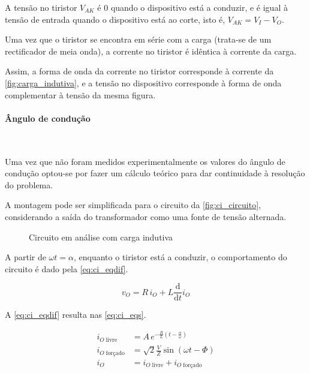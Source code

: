 \documentclass[a4paper,11pt]{article}
\numberwithin{equation}{section}
\begin{document}
A tensão no tiristor $V_{AK}$ é $0$ quando o dispositivo está a conduzir, e é igual à tensão de entrada quando o dispositivo está ao corte, isto é, $V_{AK} = V_I - V_O$.

Uma vez que o tiristor se encontra em série com a carga (trata-se de um rectificador de meia onda), a corrente no tiristor é idêntica à corrente da carga.

Assim, a forma de onda da corrente no tiristor corresponde à corrente da \autoref{fig:carga_indutiva}, e a tensão no dispositivo corresponde à forma de onda complementar à tensão da mesma figura.

\paragraph{Ângulo de condução}\mbox{}\

Uma vez que não foram medidos experimentalmente os valores do ângulo de condução optou-se por fazer um cálculo teórico para dar continuidade à resolução do problema.

A montagem pode ser simplificada para o circuito da \autoref{fig:ci_circuito}, considerando a saída do transformador como uma fonte de tensão alternada.

\begin{figure}[H]
	\centering
	\caption{Circuito em análise com carga indutiva}
	\label{fig:ci_circuito}
\end{figure}


A partir de $\omega t = \alpha$, enquanto o tiristor está a conduzir, o comportamento do circuito é dado pela \autoref{eq:ci_eqdif}.

\begin{equation}
\label{eq:ci_eqdif}
v_O = R\,i_{O} + L \frac{\mathrm{d}}{\mathrm{d}t}i_O
\end{equation}

A \autoref{eq:ci_eqdif} resulta nas \autoref{eq:ci_eqs}.

\begin{subequations}
\label{eq:ci_eqs}
\begin{align}
i_{O\;\text{livre}} &= A\,e^{-\frac{R}{L}(t - \frac{\alpha}{\omega})}\\
i_{O\;\text{forçado}} &= \sqrt{2} \frac{V}{Z} \sin{(\omega t - \Phi)}\\
i_O &= i_{O\;\text{livre}} + i_{O\;\text{forçado}}
\end{align}
\end{subequations}
\end{document}
